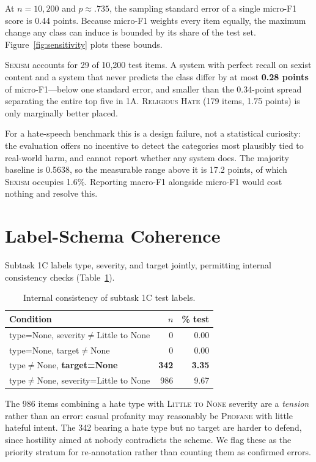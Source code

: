 \documentclass[11pt]{article}
\begin{document}
At $n=10{,}200$ and $p\approx.735$, the sampling standard error of a single
micro-F1 score is 0.44 points. Because micro-F1 weights every item equally, the
maximum change any class can induce is bounded by its share of the test set.
Figure~\ref{fig:sensitivity} plots these bounds.

\textsc{Sexism} accounts for 29 of 10{,}200 test items. A system with perfect
recall on sexist content and a system that never predicts the class differ by at
most \textbf{0.28 points} of micro-F1---below one standard error, and smaller
than the 0.34-point spread separating the entire top five in 1A.
\textsc{Religious Hate} (179 items, 1.75 points) is only marginally better
placed.

For a hate-speech benchmark this is a design failure, not a statistical
curiosity: the evaluation offers no incentive to detect the categories most
plausibly tied to real-world harm, and cannot report whether any system does.
The majority baseline is 0.5638, so the measurable range above it is 17.2
points, of which \textsc{Sexism} occupies 1.6\%. Reporting macro-F1 alongside
micro-F1 would cost nothing and resolve this.

\section{Label-Schema Coherence}
\label{sec:coherence}

Subtask 1C labels type, severity, and target jointly, permitting internal
consistency checks (Table~\ref{tab:coherence}).

\begin{table}[h]
\centering\small
\begin{tabular}{lrr}
\toprule
Condition & $n$ & \% test \\
\midrule
type=None, severity$\neq$Little to None & 0 & 0.00 \\
type=None, target$\neq$None & 0 & 0.00 \\
type$\neq$None, \textbf{target=None} & \textbf{342} & \textbf{3.35} \\
type$\neq$None, severity=Little to None & 986 & 9.67 \\
\bottomrule
\end{tabular}
\caption{Internal consistency of subtask 1C test labels.}
\label{tab:coherence}
\end{table}

The 986 items combining a hate type with \textsc{Little to None} severity are a
\emph{tension} rather than an error: casual profanity may reasonably be
\textsc{Profane} with little hateful intent. The 342 bearing a hate type but no
target are harder to defend, since hostility aimed at nobody contradicts the
scheme. We flag these as the priority stratum for re-annotation rather than
counting them as confirmed errors.
\end{document}
